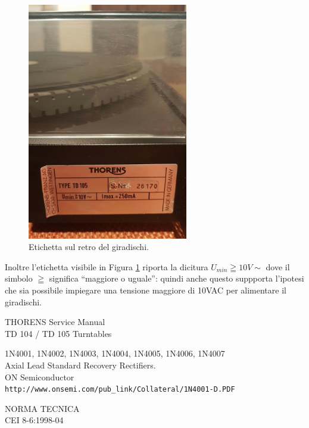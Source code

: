 \documentclass[a4paper,12pt]{article} %
\begin{document}
\begin{figure}[h]
\centering
\includegraphics[width=7cm]{thorens_label}
\caption{Etichetta sul retro del giradischi.}
\label{fig:label}
\end{figure}

Inoltre l'etichetta visibile in Figura \ref{fig:label} riporta la dicitura
$U_{min}\geqq10V\sim$ dove il simbolo 
$\geqq$ significa ``maggiore o uguale'': quindi anche
questo suppporta l'ipotesi che sia possibile impiegare una
tensione maggiore di 10VAC per alimentare il giradischi.

\begin{thebibliography}{9}
THORENS Service Manual
\\TD 104 / TD 105 Turntables

1N4001, 1N4002, 1N4003,
1N4004, 1N4005, 1N4006,
1N4007
\\Axial Lead Standard Recovery Rectifiers.
\\ ON Semiconductor
\\\texttt{http://www.onsemi.com/pub\_link/Collateral/1N4001-D.PDF}

NORMA TECNICA
\\CEI 8-6:1998-04



\end{thebibliography}
\end{document}
